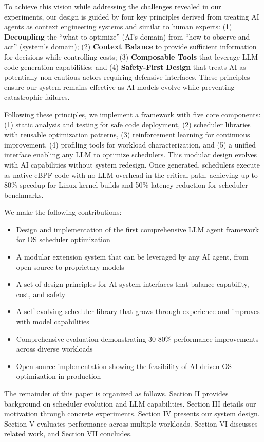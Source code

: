 To achieve this vision while addressing the challenges revealed in our experiments, our design is guided by four key principles derived from treating AI agents as context engineering systems and similar to human experts: (1) \textbf{Decoupling} the ``what to optimize'' (AI's domain) from ``how to observe and act'' (system's domain); (2) \textbf{Context Balance} to provide sufficient information for decisions while controlling costs; (3) \textbf{Composable Tools} that leverage LLM code generation capabilities; and (4) \textbf{Safety-First Design} that treats AI as potentially non-cautious actors requiring defensive interfaces. These principles ensure our system remains effective as AI models evolve while preventing catastrophic failures.

Following these principles, we implement a framework with five core components: (1) static analysis and testing for safe code deployment, (2) scheduler libraries with reusable optimization patterns, (3) reinforcement learning for continuous improvement, (4) profiling tools for workload characterization, and (5) a unified interface enabling any LLM to optimize schedulers. This modular design evolves with AI capabilities without system redesign. Once generated, schedulers execute as native eBPF code with no LLM overhead in the critical path, achieving up to 80\% speedup for Linux kernel builds and 50\% latency reduction for scheduler benchmarks.

We make the following contributions:
\begin{itemize}
\item Design and implementation of the first comprehensive LLM agent framework for OS scheduler optimization
\item A modular extension system that can be leveraged by any AI agent, from open-source to proprietary models
\item A set of design principles for AI-system interfaces that balance capability, cost, and safety
\item A self-evolving scheduler library that grows through experience and improves with model capabilities
\item Comprehensive evaluation demonstrating 30-80\% performance improvements across diverse workloads
\item Open-source implementation showing the feasibility of AI-driven OS optimization in production
\end{itemize}

The remainder of this paper is organized as follows. Section II provides background on scheduler evolution and LLM capabilities. Section III details our motivation through concrete experiments. Section IV presents our system design. Section V evaluates performance across multiple workloads. Section VI discusses related work, and Section VII concludes.